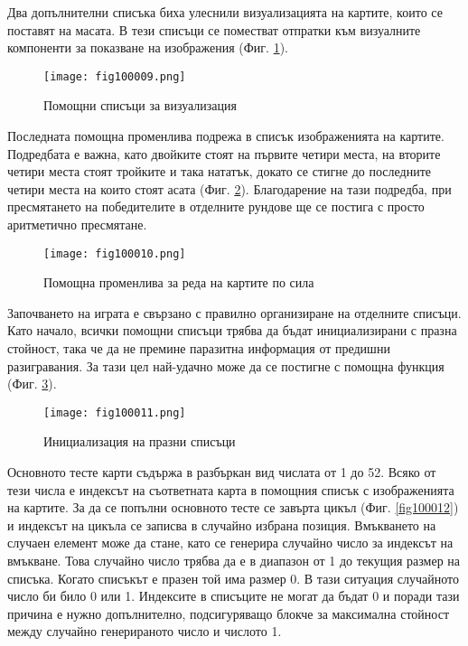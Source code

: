 Два допълнителни списъка биха улеснили визуализацията на картите, които се поставят на масата. В тези списъци се поместват отпратки към визуалните компоненти за показване на изображения (Фиг. \ref{fig100009}).

\begin{figure}[H]
  \centering
  \texttt{[image: fig100009.png]}
  \caption{Помощни списъци за визуализация}
\label{fig100009}
\end{figure}

Последната помощна променлива подрежа в списък изображенията на картите. Подредбата е важна, като двойките стоят на първите четири места, на вторите четири места стоят тройките и така нататък, докато се стигне до последните четири места на които стоят асата (Фиг. \ref{fig100010}). Благодарение на тази подредба, при пресмятането на победителите в отделните рундове ще се постига с просто аритметично пресмятане. 

\begin{figure}[H]
  \centering
  \texttt{[image: fig100010.png]}
  \caption{Помощна променлива за реда на картите по сила}
\label{fig100010}
\end{figure}

Започването на играта е свързано с правилно организиране на отделните списъци. Като начало, всички помощни списъци трябва да бъдат инициализирани с празна стойност, така че да не премине паразитна информация от предишни разигравания. За тази цел най-удачно може да се постигне с помощна функция (Фиг. \ref{fig100011}).

\begin{figure}[H]
  \centering
  \texttt{[image: fig100011.png]}
  \caption{Инициализация на празни списъци}
\label{fig100011}
\end{figure}

Основното тесте карти съдържа в разбъркан вид числата от 1 до 52. Всяко от тези числа е индексът на съответната карта в помощния списък с изображенията на картите. За да се попълни основното тесте се завърта цикъл (Фиг. \ref{fig100012}) и индексът на цикъла се записва в случайно избрана позиция. Вмъкването на случаен елемент може да стане, като се генерира случайно число за индексът на вмъкване. Това случайно число трябва да е в диапазон от 1 до текущия размер на списъка. Когато списъкът е празен той има размер 0. В тази ситуация случайното число би било 0 или 1. Индексите в списъците не могат да бъдат 0 и поради тази причина е нужно допълнително, подсигуряващо блокче за максимална стойност между случайно генерираното число и числото 1.

